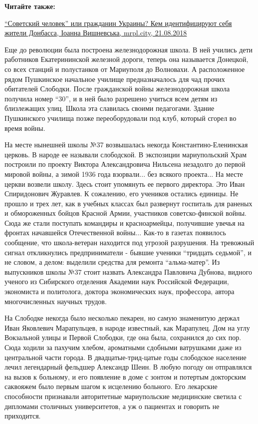 \textbf{Читайте также:} 

\href{https://mrpl.city/news/view/sovetskij-chelovek-ili-grazhdanin-ukrainy-kem-identifitsiruyut-sebya-zhiteli-donbassa}{%
\enquote{Советский человек} или гражданин Украины? Кем идентифицируют себя жители Донбасса, Іоанна Вишневська, mrpl.city, 21.08.2018}

Еще до революции была построена железнодорожная школа. В ней учились дети
работников Екатерининской железной дороги, теперь она называется Донецкой, со
всех станций и полустанков от Мариуполя до Волновахи. А расположенное рядом
Пушкинское начальное училище предназначалось для чад прочих обитателей
Слободки. После гражданской войны железнодорожная школа получила номер \enquote{30}, и
в ней было разрешено учиться всем детям из близлежащих улиц. Школа эта
славилась своими педагогами. Здание Пушкинского училища позже переоборудовали
под клуб, который сгорел во время войны.

На месте нынешней школы №37 возвышалась некогда Константино-Еленинская церковь.
В народе ее называли слободской. В экспозиции мариупольский Храм построили по
проекту Виктора Александровича Нильсена незадолго до первой мировой войны, а
зимой 1936 года взорвали... без всякого проекта... На месте церкви  возвели школу.
Здесь стоит упомянуть ее первого директора. Это Иван Спиридонович Журавлев. К
сожалению, его учеников остались единицы. Не прошло и трех лет, как в учебных
классах был развернут госпиталь для раненых и обмороженных бойцов Красной
Армии, участников советско-финской войны. Сюда же стали поступать командиры и
красноармейцы, получившие увечья на фронтах начавшейся Отечественной войны...
Как-то в газетах появилось сообщение, что школа-ветеран находится под угрозой
разрушения. На тревожный сигнал откликнулись предприниматели - бывшие ученики
\enquote{тридцать седьмой}, и не словом, а делом: выделили средства для ремонта
\enquote{альма-матер}. Из выпускников школы №37 стоит назвать Александра Павловича
Дубнова, видного ученого из Сибирского отделения Академии наук Российской
Федерации, экономиста и политолога, доктора экономических наук, профессора,
автора многочисленных научных трудов.

На Слободке некогда было несколько пекарен, но самую знаменитую держал Иван
Яковлевич Марапульцев, в народе известный, как Марапулец. Дом на углу
Вокзальной улицы и Первой Слободки, где она была, сохранился до сих пор. Сюда
ходили за пахучим хлебом, ароматными сдобными ватрушками даже из центральной
части города. В двадцатые-трид\hyp{}цатые годы слободское население лечил легендарный
фельдшер Александр Шеин. В любую погоду он отправлялся на вызов к больному, и
его появление в доме с зонтом и потертым докторским саквояжем было первым шагом
к исцелению больного. Его лекарские способности признавали авторитетные
мариупольские медицинские светила с дипломами столичных университетов, а уж о
пациентах и говорить не приходится.

